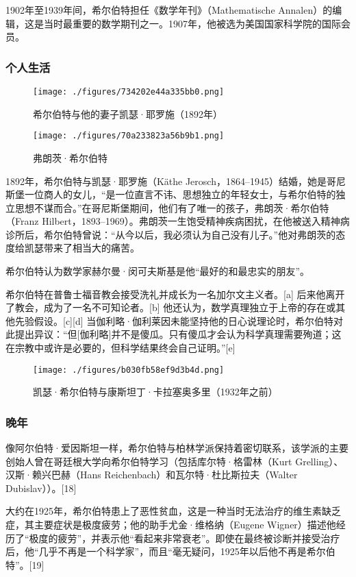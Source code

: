 1902年至1939年间，希尔伯特担任《数学年刊》（Mathematische Annalen）的编辑，这是当时最重要的数学期刊之一。1907年，他被选为美国国家科学院的国际会员。
\subsubsection{个人生活}
\begin{figure}[ht]
\centering
\texttt{[image: ./figures/734202e44a335bb0.png]}
\caption{希尔伯特与他的妻子凯瑟·耶罗施（1892年）} \label{fig_David_5}
\end{figure}
\begin{figure}[ht]
\centering
\texttt{[image: ./figures/70a233823a56b9b1.png]}
\caption{弗朗茨·希尔伯特} \label{fig_David_6}
\end{figure}
1892年，希尔伯特与凯瑟·耶罗施（Käthe Jerosch，1864–1945）结婚，她是哥尼斯堡一位商人的女儿，“是一位直言不讳、思想独立的年轻女士，与希尔伯特的独立思想不谋而合。”在哥尼斯堡期间，他们有了唯一的孩子，弗朗茨·希尔伯特（Franz Hilbert，1893–1969）。弗朗茨一生饱受精神疾病困扰，在他被送入精神病诊所后，希尔伯特曾说：“从今以后，我必须认为自己没有儿子。”他对弗朗茨的态度给凯瑟带来了相当大的痛苦。

希尔伯特认为数学家赫尔曼·闵可夫斯基是他“最好的和最忠实的朋友”。

希尔伯特在普鲁士福音教会接受洗礼并成长为一名加尔文主义者。[a] 后来他离开了教会，成为了一名不可知论者。[b] 他还认为，数学真理独立于上帝的存在或其他先验假设。[c][d] 当伽利略·伽利莱因未能坚持他的日心说理论时，希尔伯特对此提出异议：“但[伽利略]并不是傻瓜。只有傻瓜才会认为科学真理需要殉道；这在宗教中或许是必要的，但科学结果终会自己证明。”[e]
\begin{figure}[ht]
\centering
\texttt{[image: ./figures/b030fb58ef9d3b4d.png]}
\caption{凯瑟·希尔伯特与康斯坦丁·卡拉塞奥多里（1932年之前）} \label{fig_David_7}
\end{figure}
\subsubsection{晚年} 
像阿尔伯特·爱因斯坦一样，希尔伯特与柏林学派保持着密切联系，该学派的主要创始人曾在哥廷根大学向希尔伯特学习（包括库尔特·格雷林（Kurt Grelling）、汉斯·赖兴巴赫（Hans Reichenbach）和瓦尔特·杜比斯拉夫（Walter Dubislav））。[18]

大约在1925年，希尔伯特患上了恶性贫血，这是一种当时无法治疗的维生素缺乏症，其主要症状是极度疲劳；他的助手尤金·维格纳（Eugene Wigner）描述他经历了“极度的疲劳”，并表示他“看起来非常衰老”。即使在最终被诊断并接受治疗后，他“几乎不再是一个科学家”，而且“毫无疑问，1925年以后他不再是希尔伯特”。[19]

